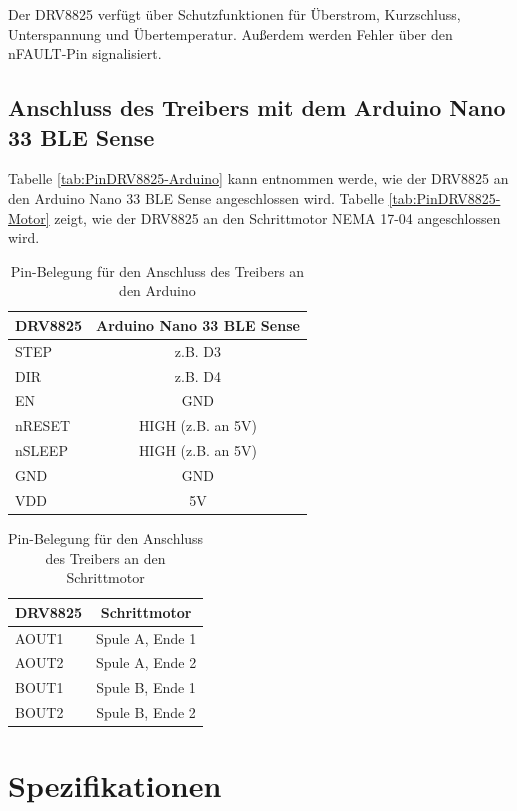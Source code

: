 Der DRV8825 verfügt über Schutzfunktionen für Überstrom, Kurzschluss, Unterspannung und Übertemperatur. Außerdem werden Fehler über den nFAULT-Pin signalisiert. 

\subsection{Anschluss des Treibers mit dem Arduino Nano 33 BLE Sense}

Tabelle \autoref{tab:PinDRV8825-Arduino} kann entnommen werde, wie der DRV8825 an den Arduino Nano 33 BLE Sense angeschlossen wird. Tabelle \autoref{tab:PinDRV8825-Motor} zeigt, wie der DRV8825 an den Schrittmotor NEMA 17-04 angeschlossen wird. 

\begin{table}[htpb]
	\centering
	\begin{tabular}{|l|c|}
		\hline
		\textbf{DRV8825} & \textbf{Arduino Nano 33 BLE Sense} \\
		\hline
		STEP & z.B. D3 \\
		DIR & z.B. D4 \\
		EN & GND \\
		nRESET & HIGH (z.B. an 5V) \\
		nSLEEP & HIGH (z.B. an 5V) \\
		GND & GND \\
		VDD & 5V \\
		\hline
	\end{tabular}
	\caption{Pin-Belegung für den Anschluss des Treibers an den Arduino}
	\label{tab:PinDRV8825-Arduino}
\end{table}

\begin{table}[htpb]
	\centering
	\begin{tabular}{|l|c|}
		\hline
		\textbf{DRV8825} & \textbf{Schrittmotor} \\
		\hline
		AOUT1 & Spule A, Ende 1 \\
		AOUT2 & Spule A, Ende 2 \\
		BOUT1 & Spule B, Ende 1 \\
		BOUT2 & Spule B, Ende 2 \\
		\hline
	\end{tabular}
	\caption{Pin-Belegung für den Anschluss des Treibers an den Schrittmotor}
	\label{tab:PinDRV8825-Motor}
\end{table}

\section{Spezifikationen}

